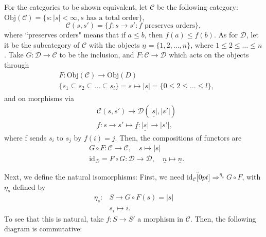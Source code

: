 \documentclass[../category_theory.tex]{subfiles}
\begin{document}
\begin{example}
	For the categories to be shown equivalent, let \(\mathcal{C}\) be the following category: \(\mathrm{Obj}(\mathcal{C})=\{s: |s|<\infty, s \text{ has a total order}\}\),
	\[
		\mathcal{C}(s, s')=\{f:s\rightarrow s': f \text{ preserves orders}\},
	\]
	where ``preserves orders" means that if \(a \leq b\), then \(f(a)\leq f(b)\). As for \(\mathcal{D}\), let it be the subcategory of \(\mathcal{C}\) with the objects \(\underline{n}=\{1,2,\dotsc ,n\}\), where \(1\leq 2\leq \dotsc \leq n\). Take \(G:\mathcal{D}\rightarrow \mathcal{C}\) to be the inclusion, and \(F:\mathcal{C}\rightarrow \mathcal{D}\) which acts on the objects through
	\begin{align*}
		 & F:\mathrm{Obj}(\mathcal{C})\rightarrow \mathrm{Obj}(D)                                                          \\
		 & \{s_1\subseteq s_2\subseteq \dotsc \subseteq s_{l}\} = s \mapsto \underline{|s|}=\{0\leq 2\leq \dotsc \leq l\},
	\end{align*}
	and on morphisms via
	\begin{align*}
		 & \mathcal{C}(s, s')\rightarrow \mathcal{D}(\underline{|s|}, |s'|)        \\
		 & f:s\rightarrow s'\mapsto \underline{f}:\underline{|s|}\rightarrow |s'|,
	\end{align*}
	where f sends \(s_{i}\) to \(s_{j}\) by \(f(i)=j\). Then, the compositions of functors are
	\begin{align*}
		 & G\circ F:\mathcal{C}\rightarrow \mathcal{C},\quad s\mapsto |s|                                                  \\
		 & \mathrm{id}_{\mathcal{D}}=F\circ G:\mathcal{D}\rightarrow \mathcal{D},\quad \underline{n}\mapsto \underline{n}.
	\end{align*}

	Next, we define the natural isomorphisms: First, we need \(\mathrm{id}_{\mathcal{C}}\overbracket[0pt]{\Rightarrow}^{\eta_{s} } G\circ F\), with \(\eta_{s}\) defined by
	\begin{align*}
		\eta_{s}: & S\rightarrow G\circ F(s)=|s| \\
		          & s_{i}\mapsto i.
	\end{align*}
	To see that this is natural, take \(f:S\rightarrow S'\) a morphism in \(\mathcal{C}.\) Then, the following diagram is commutative:
	\begin{center}
\end{center}
\end{example}
\end{document}
